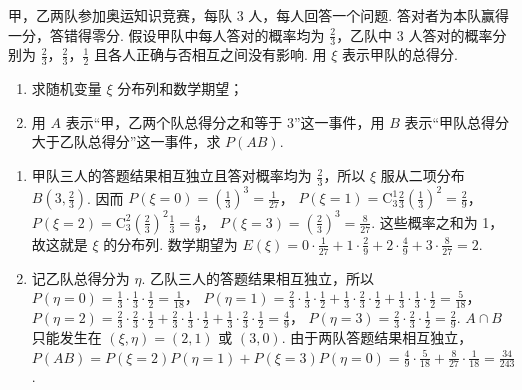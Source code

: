\begin{problem}
甲，乙两队参加奥运知识竞赛，每队 \(3\) 人，每人回答一个问题. 答对者为本队赢得一分，答错得零分. 假设甲队中每人答对的概率均为 \(\frac{2}{3}\)，乙队中 \(3\) 人答对的概率分别为 \(\frac{2}{3}\)，\(\frac{2}{3}\)，\(\frac{1}{2}\) 且各人正确与否相互之间没有影响. 用 \(\xi\) 表示甲队的总得分.
\begin{enumerate}
\item 求随机变量 \(\xi\) 分布列和数学期望；
\item 用 \(A\) 表示“甲，乙两个队总得分之和等于 \(3\)”这一事件，用 \(B\) 表示“甲队总得分大于乙队总得分”这一事件，求 \(P(AB)\).
\end{enumerate}
\end{problem}

\begin{solution}
\begin{enumerate}
\item 甲队三人的答题结果相互独立且答对概率均为 \(\frac23\)，所以 \(\xi\) 服从二项分布 \(B\left(3,\frac23\right)\). 因而
\(P(\xi=0)=\left(\frac13\right)^3=\frac1{27}\)，
\(P(\xi=1)=\mathrm C_3^1\frac23\left(\frac13\right)^2=\frac2{9}\)，
\(P(\xi=2)=\mathrm C_3^2\left(\frac23\right)^2\frac13=\frac4{9}\)，
\(P(\xi=3)=\left(\frac23\right)^3=\frac8{27}\). 这些概率之和为 1，故这就是 \(\xi\) 的分布列. 数学期望为
\(E(\xi)=0\cdot\frac1{27}+1\cdot\frac2{9}+2\cdot\frac4{9}+3\cdot\frac8{27}=2\).

\item 记乙队总得分为 \(\eta\). 乙队三人的答题结果相互独立，所以
\(P(\eta=0)=\frac13\cdot\frac13\cdot\frac12=\frac1{18}\)，
\(P(\eta=1)=\frac23\cdot\frac13\cdot\frac12+\frac13\cdot\frac23\cdot\frac12+\frac13\cdot\frac13\cdot\frac12=\frac5{18}\)，
\(P(\eta=2)=\frac23\cdot\frac23\cdot\frac12+\frac23\cdot\frac13\cdot\frac12+\frac13\cdot\frac23\cdot\frac12=\frac4{9}\)，
\(P(\eta=3)=\frac23\cdot\frac23\cdot\frac12=\frac2{9}\).
\(A\cap B\) 只能发生在 \((\xi,\eta)=(2,1)\) 或 \((3,0)\). 由于两队答题结果相互独立，
\(P(AB)=P(\xi=2)P(\eta=1)+P(\xi=3)P(\eta=0)=\frac4{9}\cdot\frac5{18}+\frac8{27}\cdot\frac1{18}=\frac{34}{243}\).
\end{enumerate}
\end{solution}

